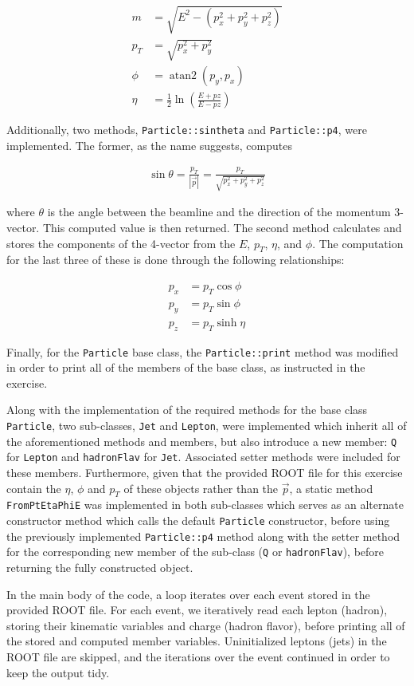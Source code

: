 \documentclass{article}
\newcounter{exercise}
\begin{document}
\begin{align*}
    m &= \sqrt{E^2 - (p_x^2 + p_y^2 + p_z^2)}\\
    p_T &= \sqrt{p_x^2 + p_y^2}\\
    \phi &=  \operatorname{atan2}(p_y, p_x)\\
    \eta &= \frac12 \ln\left(\frac{E + pz}{E - pz}\right)
\end{align*}

Additionally, two methods, \texttt{Particle::sintheta} and \texttt{Particle::p4}, were implemented. The former, as the name suggests, computes

\begin{align*}
    \sin\theta = \frac{p_T}{|\vec p|} = \frac{p_T}{\sqrt{p_x^2 + p_y^2 + p_z^2}}
\end{align*}

\noindent where $\theta$ is the angle between the beamline and the direction of the momentum 3-vector. This computed value is then returned. The second method calculates and stores the components of the 4-vector from the $E$, $p_T$, $\eta$, and $\phi$. The computation for the last three of these is done through the following relationships:

\begin{align*}
    p_x &= p_T \cos\phi\\
    p_y &= p_T \sin\phi\\
    p_z &= p_T \sinh\eta
\end{align*}

\noindent Finally, for the \texttt{Particle} base class, the \texttt{Particle::print} method was modified in order to print all of the members of the base class, as instructed in the exercise.

Along with the implementation of the required methods for the base class \texttt{Particle}, two sub-classes, \texttt{Jet} and \texttt{Lepton}, were implemented which inherit all of the aforementioned methods and members, but also introduce a new member: \texttt{Q} for \texttt{Lepton} and \texttt{hadronFlav} for \texttt{Jet}. Associated setter methods were included for these members. Furthermore, given that the provided ROOT file for this exercise contain the $\eta$, $\phi$ and $p_T$ of these objects rather than the $\vec p$, a static method \texttt{FromPtEtaPhiE} was implemented in both sub-classes which serves as an alternate constructor method which calls the default \texttt{Particle} constructor, before using the previously implemented \texttt{Particle::p4} method along with the setter method for the corresponding new member of the sub-class (\texttt{Q} or \texttt{hadronFlav}), before returning the fully constructed object.

In the main body of the code, a loop iterates over each event stored in the provided ROOT file. For each event, we iteratively read each lepton (hadron), storing their kinematic variables and charge (hadron flavor), before printing all of the stored and computed member variables. Uninitialized leptons (jets) in the ROOT file are skipped, and the iterations over the event continued in order to keep the output tidy.


\end{document}
